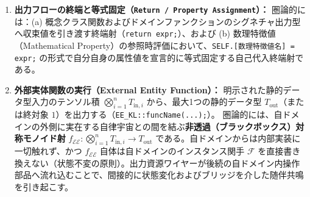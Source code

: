 \documentclass[11pt,a4paper]{ltjsarticle}
\theoremstyle{definition}
\theoremstyle{plain}
\theoremstyle{remark}
\begin{document}
\begin{enumerate}[label=\textbf{(\arabic*)}, leftmargin=*]
    \item \textbf{出力フローの終端と等式固定（\texttt{Return / Property Assignment}）：}
    圏論的には：(a) 概念クラス関数およびドメインファンクションのシグネチャ出力型へ収束値を引き渡す終端射（\texttt{return expr;}）、および (b) 数理特徴値（Mathematical Property）の参照時評価において、\texttt{SELF.[数理特徴値名] = expr;} の形式で自分自身の属性値を宣言的に等式固定する自己代入終端射である。

    \item \textbf{外部実体関数の実行（External Entity Function）：}
    明示された静的データ型入力のテンソル積 $\bigotimes_{i=1}^n T_{\mathrm{in}, i}$ から、最大1つの静的データ型 $T_{\mathrm{out}}$（または終対象 $1$）を出力する（\texttt{EE\_KL::funcName(...);}）。
    圏論的には、自ドメインの外側に実在する自律宇宙との間を結ぶ\textbf{非透過（ブラックボックス）対称モノイド射} $f_{\mathcal{EE}} : \bigotimes_{i=1}^n T_{\mathrm{in}, i} \to T_{\mathrm{out}}$ である。自ドメインからは内部実装に一切触れず、かつ $f_{\mathcal{EE}}$ 自体は自ドメインのインスタンス関手 $\mathcal{F}$ を直接書き換えない（状態不変の原則）。出力資源ワイヤーが後続の自ドメイン内操作部品へ流れ込むことで、間接的に状態変化およびブリッジを介した随伴共鳴を引き起こす。
\end{enumerate}
\end{document}
